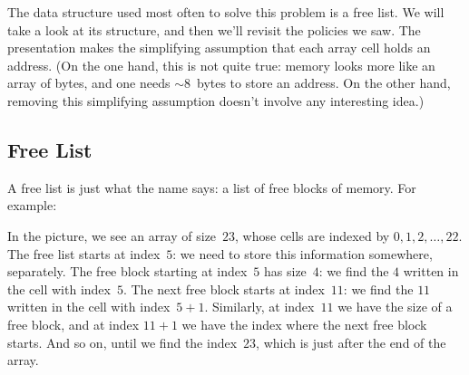 The data structure used most often to solve this problem is a free list.
We will take a look at its structure, and then we'll revisit the policies we saw.
The presentation makes the simplifying assumption
  that each array cell holds an address.
(On the one hand, this is not quite true:
  memory looks more like an array of bytes,
  and one needs $\sim8$~bytes to store an address.
On the other hand,
  removing this simplifying assumption doesn't involve any interesting idea.)

\subsection*{Free List}

A free list is just what the name says:
  a list of free blocks of memory.
For example:
\begin{center}
\end{center}
In the picture, we see an array of size~$23$,
  whose cells are indexed by $0,1,2,\ldots,22$.
The free list starts at index~$5$:
  we need to store this information somewhere, separately.
The free block starting at index~$5$ has size~$4$:
  we find the $4$ written in the cell with index~$5$.
The next free block starts at index~$11$:
  we find the $11$ written in the cell with index~$5+1$.
Similarly, at index~$11$ we have the size of a free block,
  and at index $11+1$ we have the index where the next free block starts.
And so on, until we find the index~$23$,
  which is just after the end of the array.

